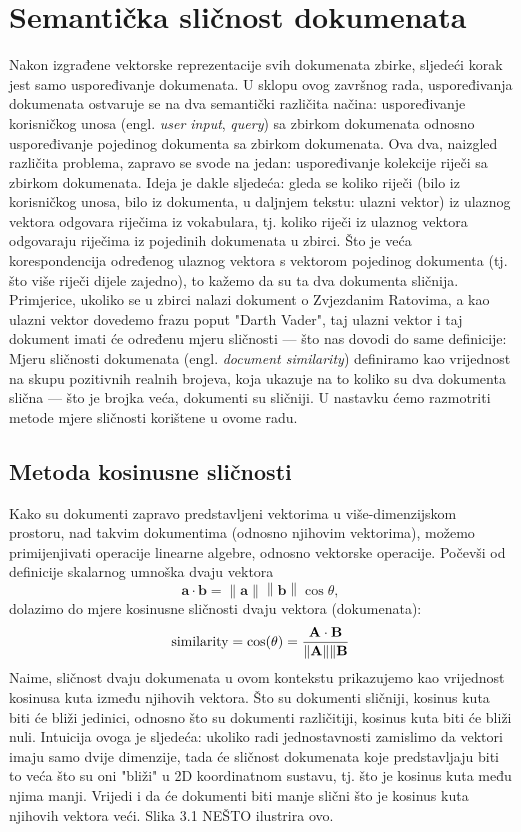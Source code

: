 \documentclass[times, utf8, zavrsni]{fer}
\begin{document}
\section{Semantička sličnost dokumenata}
Nakon izgrađene vektorske reprezentacije svih dokumenata zbirke, sljedeći korak jest samo uspoređivanje dokumenata. U sklopu ovog završnog rada, uspoređivanja dokumenata ostvaruje se na dva semantički različita načina: uspoređivanje korisničkog unosa (engl. \textit{user input}, \textit{query}) sa zbirkom dokumenata odnosno uspoređivanje pojedinog dokumenta sa zbirkom dokumenata.
Ova dva, naizgled različita problema, zapravo se svode na jedan: uspoređivanje kolekcije riječi sa zbirkom dokumenata. Ideja je dakle sljedeća: gleda se koliko riječi (bilo iz korisničkog unosa, bilo iz dokumenta, u daljnjem tekstu: ulazni vektor) iz ulaznog vektora odgovara riječima iz vokabulara, tj. koliko riječi iz ulaznog vektora odgovaraju riječima iz pojedinih dokumenata u zbirci. Što je veća korespondencija određenog ulaznog vektora s vektorom pojedinog dokumenta (tj. što više riječi dijele zajedno), to kažemo da su ta dva dokumenta sličnija. Primjerice, ukoliko se u zbirci nalazi dokument o Zvjezdanim Ratovima, a kao ulazni vektor dovedemo frazu poput "Darth Vader", taj ulazni vektor i taj dokument imati će određenu mjeru sličnosti — što nas dovodi do same definicije:
\newline
Mjeru sličnosti dokumenata (engl. \textit{document similarity}) definiramo kao vrijednost na skupu pozitivnih realnih brojeva, koja ukazuje na to koliko su dva dokumenta slična — što je brojka veća, dokumenti su sličniji.
U nastavku ćemo razmotriti metode mjere sličnosti korištene u ovome radu.

\subsection{Metoda kosinusne sličnosti}
Kako su dokumenti zapravo predstavljeni vektorima u više-dimenzijskom prostoru, nad takvim dokumentima (odnosno njihovim vektorima), možemo primijenjivati operacije linearne algebre, odnosno vektorske operacije. Počevši od definicije skalarnog umnoška dvaju vektora
\begin{equation}
\mathbf {a} \cdot \mathbf {b} =\left\|\mathbf {a} \right\|\left\|\mathbf {b} \right\|\cos \theta,
\end{equation}
dolazimo do mjere kosinusne sličnosti dvaju vektora (dokumenata):
\begin{equation}
{\text{similarity}}=\cos(\theta )={\mathbf {A} \cdot \mathbf {B}  \over \|\mathbf {A} \|\|\mathbf {B}}
\end{equation}
Naime, sličnost dvaju dokumenata u ovom kontekstu prikazujemo kao vrijednost kosinusa kuta između njihovih vektora. Što su dokumenti sličniji, kosinus kuta biti će bliži jedinici, odnosno što su dokumenti različitiji, kosinus kuta biti će bliži nuli. Intuicija ovoga je sljedeća: ukoliko radi jednostavnosti zamislimo da vektori imaju samo dvije dimenzije, tada će sličnost dokumenata koje predstavljaju biti to veća što su oni "bliži" u 2D koordinatnom sustavu, tj. što je kosinus kuta među njima manji. Vrijedi i da će dokumenti biti manje slični što je kosinus kuta njihovih vektora veći. Slika 3.1 NEŠTO ilustrira ovo.
\end{document}
